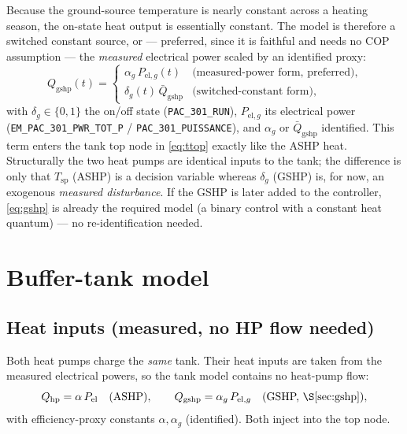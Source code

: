 \documentclass[11pt,a4paper]{article}
\newcommand{\Tsp}{T_{\mathrm{sp}}} %
\newcommand{\Qhp}{Q_{\mathrm{hp}}}
\newcommand{\Pel}{P_{\mathrm{el}}}
\newcommand{\code}[1]{\texttt{#1}}
\begin{document}
Because the ground-source temperature is nearly constant across a heating season,
the on-state heat output is essentially constant. The model is therefore a switched
constant source, or --- preferred, since it is faithful and needs no COP assumption
--- the \emph{measured} electrical power scaled by an identified proxy:
\begin{equation}
  Q_{\mathrm{gshp}}(t) =
  \begin{cases}
    \alpha_g\,P_{\mathrm{el},g}(t) & \text{(measured-power form, preferred)},\\[2pt]
    \delta_g(t)\,\bar Q_{\mathrm{gshp}} & \text{(switched-constant form)},
  \end{cases}
  \label{eq:gshp}
\end{equation}
with $\delta_g\in\{0,1\}$ the on/off state (\code{PAC\_301\_RUN}),
$P_{\mathrm{el},g}$ its electrical power (\code{EM\_PAC\_301\_PWR\_TOT\_P} /
\code{PAC\_301\_PUISSANCE}), and $\alpha_g$ or $\bar Q_{\mathrm{gshp}}$ identified.
This term enters the tank top node in \eqref{eq:ttop} exactly like the ASHP heat.
Structurally the two heat pumps are identical inputs to the tank; the difference is
only that $\Tsp$ (ASHP) is a decision variable whereas $\delta_g$ (GSHP) is, for
now, an exogenous \emph{measured disturbance}. If the GSHP is later added to the
controller, \eqref{eq:gshp} is already the required model (a binary control with a
constant heat quantum) --- no re-identification needed.

\section{Buffer-tank model}
\label{sec:tank}

\subsection{Heat inputs (measured, no HP flow needed)}
Both heat pumps charge the \emph{same} tank. Their heat inputs are taken from the
measured electrical powers, so the tank model contains no heat-pump flow:
\begin{equation}
  \Qhp = \alpha\,\Pel \quad(\text{ASHP}), \qquad
  Q_{\mathrm{gshp}} = \alpha_g\,P_{\mathrm{el},g}\quad(\text{GSHP, \S\ref{sec:gshp}}),
  \label{eq:heatin}
\end{equation}
with efficiency-proxy constants $\alpha,\alpha_g$ (identified). Both inject into the
top node.
\end{document}
